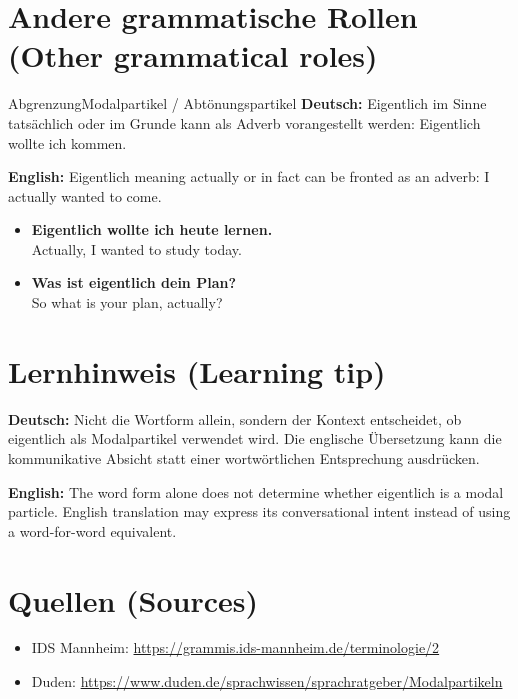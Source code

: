 \documentclass[a4paper,11pt]{article}
\newcommand{\GermanText}[1]{\textbf{Deutsch: }#1\par}
\newcommand{\EnglishText}[1]{{\small\color{SoftGray}\textbf{English: }#1\par}}
\newcommand{\ExampleItem}[2]{\item \textbf{#1}\\{\small\color{SoftGray}#2}}
\begin{document}
\section{Andere grammatische Rollen \textnormal{(Other grammatical roles)}}
\begin{grammarentry}{Abgrenzung}{Modalpartikel / Abtönungspartikel}
\GermanText{Eigentlich im Sinne tatsächlich oder im Grunde kann als Adverb vorangestellt werden: Eigentlich wollte ich kommen.}
\EnglishText{Eigentlich meaning actually or in fact can be fronted as an adverb: I actually wanted to come.}
\end{grammarentry}
\begin{exbox}\begin{itemize}
\ExampleItem{Eigentlich wollte ich heute lernen.}{Actually, I wanted to study today.}
\ExampleItem{Was ist eigentlich dein Plan?}{So what is your plan, actually?}
\end{itemize}\end{exbox}
\section{Lernhinweis \textnormal{(Learning tip)}}
\GermanText{Nicht die Wortform allein, sondern der Kontext entscheidet, ob eigentlich als Modalpartikel verwendet wird. Die englische Übersetzung kann die kommunikative Absicht statt einer wortwörtlichen Entsprechung ausdrücken.}
\EnglishText{The word form alone does not determine whether eigentlich is a modal particle. English translation may express its conversational intent instead of using a word-for-word equivalent.}
\section{Quellen \textnormal{(Sources)}}
\begin{itemize}
\item IDS Mannheim: \url{https://grammis.ids-mannheim.de/terminologie/2}
\item Duden: \url{https://www.duden.de/sprachwissen/sprachratgeber/Modalpartikeln}
\end{itemize}
\end{document}
